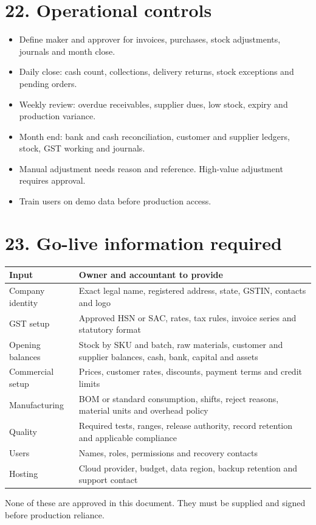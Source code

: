 \documentclass[11pt]{article}
\begin{document}
\section{22. Operational controls}
\begin{itemize}[leftmargin=*,itemsep=2pt,topsep=2pt]
\item Define maker and approver for invoices, purchases, stock adjustments, journals and month close.
\item Daily close: cash count, collections, delivery returns, stock exceptions and pending orders.
\item Weekly review: overdue receivables, supplier dues, low stock, expiry and production variance.
\item Month end: bank and cash reconciliation, customer and supplier ledgers, stock, GST working and journals.
\item Manual adjustment needs reason and reference. High-value adjustment requires approval.
\item Train users on demo data before production access.
\end{itemize}
\clearpage
\section{23. Go-live information required}
\begin{center}\small\begin{tabularx}{\linewidth}{|*{2}{>{\raggedright\arraybackslash}X|}}
\hline
\textbf{Input} & \textbf{Owner and accountant to provide} \\
\hline
Company identity & Exact legal name, registered address, state, GSTIN, contacts and logo \\
\hline
GST setup & Approved HSN or SAC, rates, tax rules, invoice series and statutory format \\
\hline
Opening balances & Stock by SKU and batch, raw materials, customer and supplier balances, cash, bank, capital and assets \\
\hline
Commercial setup & Prices, customer rates, discounts, payment terms and credit limits \\
\hline
Manufacturing & BOM or standard consumption, shifts, reject reasons, material units and overhead policy \\
\hline
Quality & Required tests, ranges, release authority, record retention and applicable compliance \\
\hline
Users & Names, roles, permissions and recovery contacts \\
\hline
Hosting & Cloud provider, budget, data region, backup retention and support contact \\
\hline
\end{tabularx}\end{center}
None of these are approved in this document. They must be supplied and signed before production reliance.
\clearpage
\end{document}
